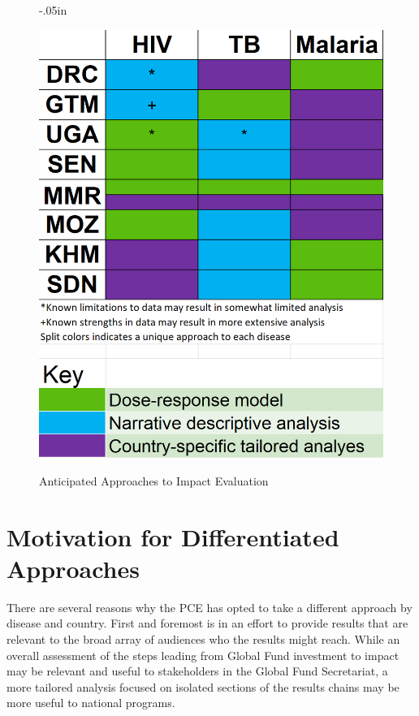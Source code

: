 \documentclass[twocolumn]{bmcart}%
\begin{document}
\begin{figure}[h]
  \advance\leftskip-.05in
  \caption{\textmd{Anticipated Approaches to Impact Evaluation}}
  \includegraphics[scale=.4]{Differentiated_Plans_Image.png} \\
  \label{fig1}
\end{figure}


\section{Motivation for Differentiated Approaches} \label{why}

There are several reasons why the PCE has opted to take a different approach by disease and country. First and foremost is in an effort to provide results that are relevant to the broad array of audiences who the results might reach. While an overall assessment of the steps leading from Global Fund investment to impact may be relevant and useful to stakeholders in the Global Fund Secretariat, a more tailored analysis focused on isolated sections of the results chains may be more useful to national programs. \\
\end{document}
